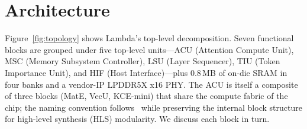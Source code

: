 \documentclass[conference]{IEEEtran}
\begin{document}
\section{Architecture}
\label{sec:architecture}

Figure~\ref{fig:topology} shows Lambda's top-level decomposition. Seven functional blocks are grouped under five top-level units---ACU (Attention Compute Unit), MSC (Memory Subsystem Controller), LSU (Layer Sequencer), TIU (Token Importance Unit), and HIF (Host Interface)---plus 0.8\,MB of on-die SRAM in four banks and a vendor-IP LPDDR5X x16 PHY. The ACU is itself a composite of three blocks (MatE, VecU, KCE-mini) that share the compute fabric of the chip; the naming convention follows~\cite{chaithu_acu} while preserving the internal block structure for high-level synthesis (HLS) modularity. We discuss each block in turn.
\end{document}

